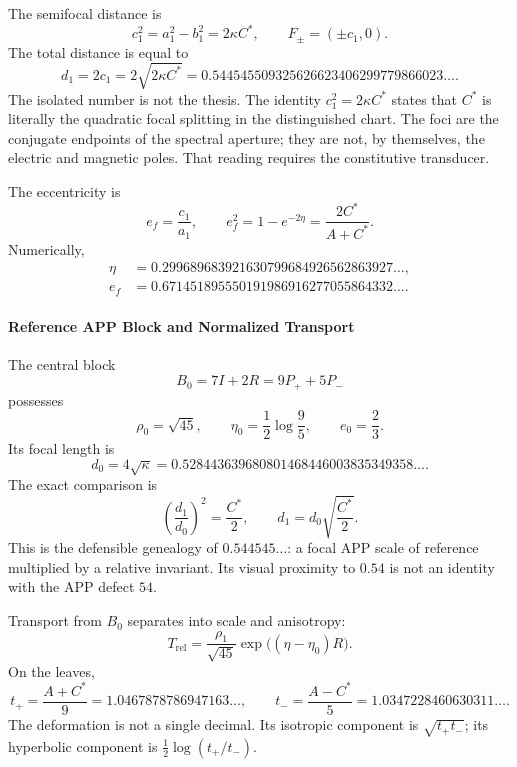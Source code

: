 The semifocal distance is
\begin{equation}
c_1^2=a_1^2-b_1^2=2\kappa C^*,
\qquad
F_\pm=(\pm c_1,0).
\label{eq:focos}
\end{equation}
The total distance is equal to
\begin{equation}
d_1=2c_1=2\sqrt{2\kappa C^*}
=0.544545509325626623406299779866023\ldots.
\label{eq:d1}
\end{equation}
The isolated number is not the thesis. The identity \(c_1^2=2\kappa C^*\) states that
\(C^*\) is literally the quadratic focal splitting in the
distinguished chart. The foci are the conjugate endpoints of the spectral aperture;
they are not, by themselves, the electric and magnetic poles. That reading requires
the constitutive transducer.

The eccentricity is
\begin{equation}
e_f=\frac{c_1}{a_1},\qquad
e_f^2=1-e^{-2\eta}=\frac{2C^*}{A+C^*}.
\label{eq:excentricidad}
\end{equation}
Numerically,
\[
\begin{aligned}
\eta&=0.299689683921630799684926562863927\ldots,\\
e_f&=0.671451895550191986916277055864332\ldots.
\end{aligned}
\]

\paragraph{Reference APP Block and Normalized Transport}

The central block
\[
B_0=7I+2R=9P_++5P_-
\]
possesses
\[
\rho_0=\sqrt{45},\qquad
\eta_0=\frac12\log\frac95,\qquad
e_0=\frac23.
\]
Its focal length is
\[
d_0=4\sqrt\kappa
=0.528443639680801468446003835349358\ldots.
\]
The exact comparison is
\begin{equation}
\boxed{\left(\frac{d_1}{d_0}\right)^2=\frac{C^*}{2}},
\qquad
d_1=d_0\sqrt{\frac{C^*}{2}}.
\label{eq:invariante-focal-relativo}
\end{equation}
This is the defensible genealogy of \(0.544545\ldots\): a focal APP scale
of reference multiplied by a relative invariant. Its visual proximity to
\(0.54\) is not an identity with the APP defect \(54\).

Transport from \(B_0\) separates into scale and anisotropy:
\begin{equation}
T_{\mathrm{rel}}=\frac{\rho_1}{\sqrt{45}}
\exp\bigl((\eta-\eta_0)R\bigr).
\label{eq:transporte-rel}
\end{equation}
On the leaves,
\[
t_+=\frac{A+C^*}{9}=1.0467878786947163\ldots,
\qquad
t_-=\frac{A-C^*}{5}=1.0347228460630311\ldots.
\]
The deformation is not a single decimal. Its isotropic component is \(\sqrt{t_+t_-}\); its hyperbolic component is \(\tfrac12\log(t_+/t_-)\).

